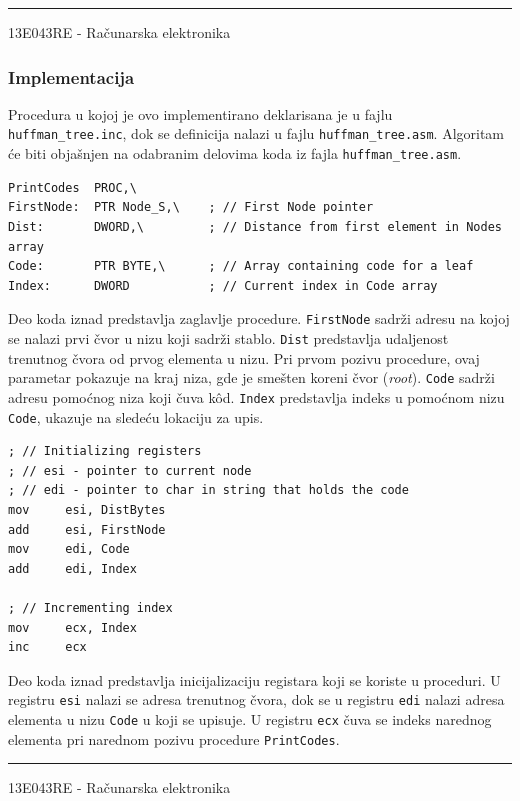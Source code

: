 \documentclass[a4paper, 12pt]{article}
\newcommand{\btmline}{
\vfill
\rule{0.9\textwidth}{0.4mm}
\begin{center}
13E043RE - Računarska elektronika
\end{center}}
\begin{document}
\btmline\newpage

\subsubsection*{Implementacija}

Procedura u kojoj je ovo implementirano deklarisana je u fajlu \verb|huffman_tree.inc|, dok se definicija nalazi u fajlu \verb|huffman_tree.asm|.
Algoritam će biti objašnjen na odabranim delovima koda iz fajla \verb|huffman_tree.asm|.

\vspace{3cm}

\begin{verbatim}
PrintCodes	PROC,\
FirstNode:	PTR Node_S,\	; // First Node pointer 
Dist:		DWORD,\			; // Distance from first element in Nodes array
Code:		PTR BYTE,\		; // Array containing code for a leaf
Index:		DWORD			; // Current index in Code array 
\end{verbatim}

Deo koda iznad predstavlja zaglavlje procedure. \verb|FirstNode| sadrži adresu na kojoj se nalazi prvi čvor u nizu koji sadrži stablo. \verb|Dist| predstavlja udaljenost trenutnog čvora od prvog elementa u nizu. Pri prvom pozivu procedure, ovaj parametar pokazuje na kraj niza, gde je smešten koreni čvor (\textit{root}). \verb|Code| sadrži adresu pomoćnog niza koji čuva k\^ od. \verb|Index| predstavlja indeks u pomoćnom nizu \verb|Code|, ukazuje na sledeću lokaciju za upis.

\vspace{2cm}

\begin{verbatim}
; // Initializing registers
; // esi - pointer to current node
; // edi - pointer to char in string that holds the code
mov		esi, DistBytes
add		esi, FirstNode
mov		edi, Code
add		edi, Index

; // Incrementing index
mov		ecx, Index
inc		ecx
\end{verbatim}

Deo koda iznad predstavlja inicijalizaciju registara koji se koriste u proceduri. U registru \verb|esi| nalazi se adresa trenutnog čvora, dok se u registru \verb|edi| nalazi adresa elementa u nizu \verb|Code| u koji se upisuje. U registru \verb|ecx| čuva se indeks narednog elementa pri narednom pozivu procedure \verb|PrintCodes|.

\btmline\newpage
\end{document}
